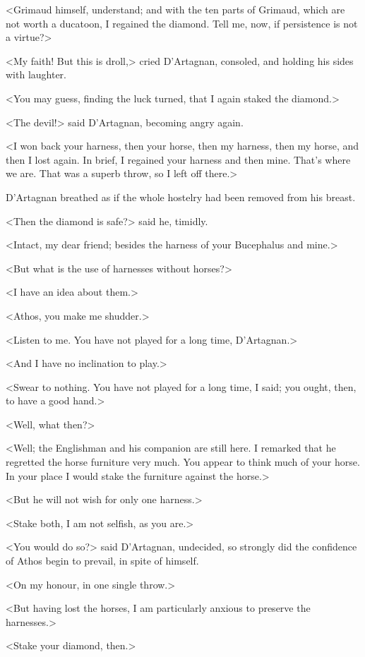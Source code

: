 <Grimaud himself, understand; and with the ten parts of Grimaud, which are not worth a ducatoon, I regained the diamond. Tell me, now, if persistence is not a virtue?> 

<My faith! But this is droll,> cried D'Artagnan, consoled, and holding his sides with laughter. 

<You may guess, finding the luck turned, that I again staked the diamond.> 

<The devil!> said D'Artagnan, becoming angry again. 

<I won back your harness, then your horse, then my harness, then my horse, and then I lost again. In brief, I regained your harness and then mine. That's where we are. That was a superb throw, so I left off there.> 

D'Artagnan breathed as if the whole hostelry had been removed from his breast. 

<Then the diamond is safe?> said he, timidly. 

<Intact, my dear friend; besides the harness of your Bucephalus and mine.> 

<But what is the use of harnesses without horses?> 

<I have an idea about them.> 

<Athos, you make me shudder.> 

<Listen to me. You have not played for a long time, D'Artagnan.> 

<And I have no inclination to play.> 

<Swear to nothing. You have not played for a long time, I said; you ought, then, to have a good hand.> 

<Well, what then?> 

<Well; the Englishman and his companion are still here. I remarked that he regretted the horse furniture very much. You appear to think much of your horse. In your place I would stake the furniture against the horse.> 

<But he will not wish for only one harness.> 

<Stake both,  I am not selfish, as you are.> 

<You would do so?> said D'Artagnan, undecided, so strongly did the confidence of Athos begin to prevail, in spite of himself. 

<On my honour, in one single throw.> 

<But having lost the horses, I am particularly anxious to preserve the harnesses.> 

<Stake your diamond, then.> 

